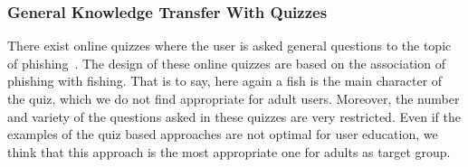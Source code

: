 \subsubsection{General Knowledge Transfer With Quizzes}
There exist online quizzes where the user is asked general questions to the topic of phishing~\cite{icicibank,onguardonline}. 
The design of these online quizzes are based on the association of phishing with fishing. 
That is to say, here again a fish is the main character of the quiz, which we do not find appropriate for adult users. 
Moreover, the number and variety of the questions asked in these quizzes are very restricted. 
Even if the examples of the quiz based approaches are not optimal for user education, we think that this approach is the most appropriate one for adults as target group.

